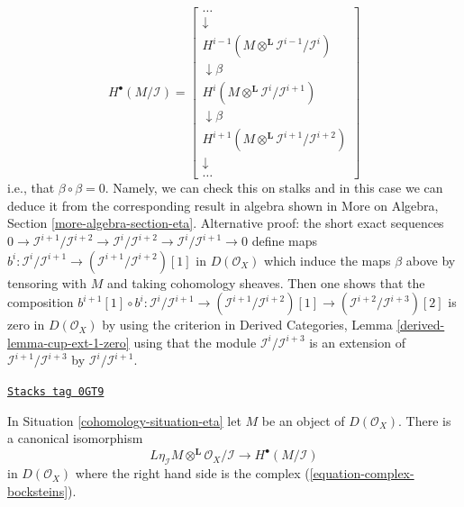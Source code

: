 \begin{equation}
\label{equation-complex-bocksteins}
H^\bullet(M/\mathcal{I}) =
\left[
\begin{matrix}
\ldots \\
\downarrow \\
H^{i - 1}(M \otimes^\mathbf{L} \mathcal{I}^{i - 1}/\mathcal{I}^i) \\
\downarrow \beta \\
H^i(M \otimes^\mathbf{L} \mathcal{I}^i/\mathcal{I}^{i + 1}) \\
\downarrow \beta \\
H^{i + 1}(M \otimes^\mathbf{L} \mathcal{I}^{i + 1}/\mathcal{I}^{i + 2}) \\
\downarrow \\
\ldots
\end{matrix}
\right]
\end{equation}
i.e., that $\beta \circ \beta = 0$. Namely, we can check this on stalks
and in this case we can deduce it from the corresponding result in algebra
shown in More on Algebra, Section \ref{more-algebra-section-eta}.
Alternative proof: the short exact sequences
$0 \to \mathcal{I}^{i + 1}/\mathcal{I}^{i + 2}
\to \mathcal{I}^i/\mathcal{I}^{i + 2}
\to \mathcal{I}^i/\mathcal{I}^{i + 1} \to 0$
define maps
$b^i : \mathcal{I}^i/\mathcal{I}^{i + 1} \to
(\mathcal{I}^{i + 1}/\mathcal{I}^{i + 2})[1]$
in $D(\mathcal{O}_X)$
which induce the maps $\beta$ above by tensoring with $M$
and taking cohomology sheaves.
Then one shows that the composition
$b^{i + 1}[1] \circ b^i : \mathcal{I}^i/\mathcal{I}^{i + 1} \to
(\mathcal{I}^{i + 1}/\mathcal{I}^{i + 2})[1] \to
(\mathcal{I}^{i + 2}/\mathcal{I}^{i + 3})[2]$
is zero in $D(\mathcal{O}_X)$ by using the criterion in
Derived Categories, Lemma \ref{derived-lemma-cup-ext-1-zero}
using that the module $\mathcal{I}^i/\mathcal{I}^{i + 3}$
is an extension of $\mathcal{I}^{i + 1}/\mathcal{I}^{i + 3}$
by $\mathcal{I}^i/\mathcal{I}^{i + 1}$.

\begin{lemma}
\label{cohomology-lemma-eta-second-property}
\href{https://stacks.math.columbia.edu/tag/0GT9}{\texttt{Stacks tag 0GT9}}

In Situation \ref{cohomology-situation-eta} let $M$ be an object of
$D(\mathcal{O}_X)$. There is a canonical isomorphism
$$
L\eta_\mathcal{I}M \otimes^\mathbf{L} \mathcal{O}_X/\mathcal{I}
\longrightarrow
H^\bullet(M/\mathcal{I})
$$
in $D(\mathcal{O}_X)$ where the right hand side is the complex
(\ref{equation-complex-bocksteins}).
\end{lemma}

